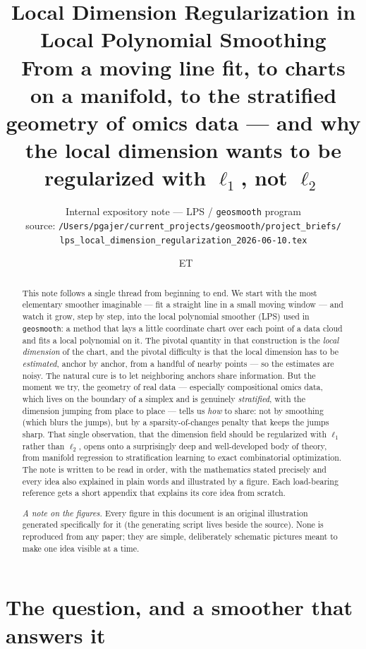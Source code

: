\documentclass[11pt]{article}
\title{\textbf{Local Dimension Regularization in Local Polynomial Smoothing}\\[4pt]
\large From a moving line fit, to charts on a manifold, to the stratified
geometry of omics data --- and why the local dimension wants to be regularized
with $\ell_1$, not $\ell_2$}
\author{\small Internal expository note --- LPS / \texttt{geosmooth} program\\[2pt]
\footnotesize source: \nolinkurl{/Users/pgajer/current_projects/geosmooth/project_briefs/}\\[1pt]
\footnotesize\nolinkurl{lps_local_dimension_regularization_2026-06-10.tex}}
\date{\DTMnow\ \textnormal{\footnotesize ET}}
\theoremstyle{definition}
\theoremstyle{remark}
\begin{document}
\maketitle

\begin{abstract}\noindent
This note follows a single thread from beginning to end. We start with the most
elementary smoother imaginable --- fit a straight line in a small moving window
--- and watch it grow, step by step, into the local polynomial smoother (LPS)
used in \texttt{geosmooth}: a method that lays a little coordinate chart over each
point of a data cloud and fits a local polynomial on it. The pivotal quantity in
that construction is the \emph{local dimension} of the chart, and the pivotal
difficulty is that the local dimension has to be \emph{estimated}, anchor by
anchor, from a handful of nearby points --- so the estimates are noisy. The
natural cure is to let neighboring anchors share information. But the moment we
try, the geometry of real data --- especially compositional omics data, which
lives on the boundary of a simplex and is genuinely \emph{stratified}, with the
dimension jumping from place to place --- tells us \emph{how} to share: not by
smoothing (which blurs the jumps), but by a sparsity-of-changes penalty that
keeps the jumps sharp. That single observation, that the dimension field should
be regularized with $\ell_1$ rather than $\ell_2$, opens onto a surprisingly deep
and well-developed body of theory, from manifold regression to stratification
learning to exact combinatorial optimization. The note is written to be read in
order, with the mathematics stated precisely and every idea also explained in
plain words and illustrated by a figure. Each load-bearing reference gets a
short appendix that explains its core idea from scratch.
\par\medskip\noindent\footnotesize\textit{A note on the figures.} Every figure in
this document is an original illustration generated specifically for it (the
generating script lives beside the source). None is reproduced from any paper;
they are simple, deliberately schematic pictures meant to make one idea visible
at a time.
\end{abstract}

{\small\tableofcontents}

\section{The question, and a smoother that answers it}\label{sec:intro}
\end{document}
